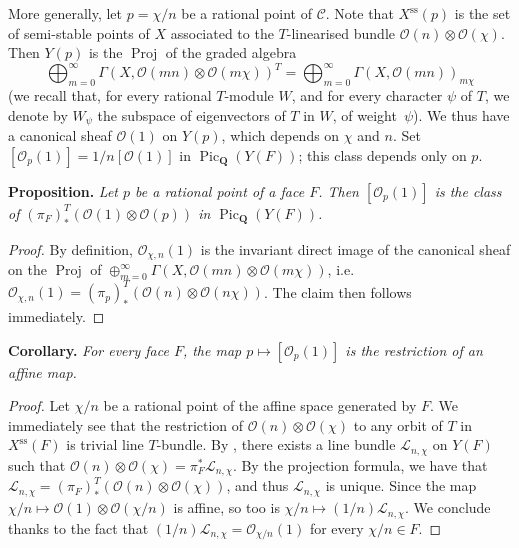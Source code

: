\documentclass{article}
\newenvironment{itenv}[1]
  {\phantomsection\par\medskip\noindent\textbf{#1.}\itshape}
  {\par\medskip}
\newcommand{\scr}[1]{{\mathscr{#1}}}
\newcommand{\QQ}{\mathbf{Q}}
\renewcommand{\ss}{\mathrm{ss}}
\DeclareMathOperator{\Pic}{Pic}
\DeclareMathOperator{\Proj}{Proj}
\newcommand{\oldpage}[1]{\marginpar{\footnotesize$\Big\vert$ \textit{p.~#1}}}
\begin{document}
More generally, let $p=\chi/n$ be a rational point of $\mathcal{C}$.
Note that $X^\ss(p)$ is the set of semi-stable points of $X$ associated to the
\oldpage{514}
$T$-linearised bundle $\scr{O}(n)\otimes\scr{O}(\chi)$.
Then $Y(p)$ is the $\Proj$ of the graded algebra
\[
  \bigoplus_{m=0}^\infty \Gamma(X,\scr{O}(mn)\otimes\scr{O}(m\chi))^T = \bigoplus_{m=0}^\infty \Gamma(X,\scr{O}(mn))_{m\chi}
\]
(we recall that, for every rational $T$-module $W$, and for every character $\psi$ of $T$, we denote by $W_\psi$ the subspace of eigenvectors of $T$ in $W$, of weight~$\psi$).
We thus have a canonical sheaf $\scr{O}(1)$ on $Y(p)$, which depends on $\chi$ and $n$.
Set $[\scr{O}_p(1)] = 1/n[\scr{O}(1)]$ in $\Pic_\QQ(Y(F))$;
this class depends only on $p$.

\begin{itenv}{Proposition}
  Let $p$ be a rational point of a face $F$.
  Then $[\scr{O}_p(1)]$ is the class of $(\pi_F)_*^T(\scr{O}(1)\otimes\scr{O}(p))$ in $\Pic_\QQ(Y(F))$.
\end{itenv}

\begin{proof}
  By definition, $\scr{O}_{\chi,n}(1)$ is the invariant direct image of the canonical sheaf on the $\Proj$ of $\oplus_{m=0}^\infty\Gamma(X,\scr{O}(mn)\otimes\scr{O}(m\chi))$, i.e. $\scr{O}_{\chi,n}(1) = (\pi_p)_*^T(\scr{O}(n)\otimes\scr{O}(n\chi))$.
  The claim then follows immediately.
\end{proof}

\begin{itenv}{Corollary}
  For every face $F$, the map $p\mapsto[\scr{O}_p(1)]$ is the restriction of an affine map.
\end{itenv}

\begin{proof}
  Let $\chi/n$ be a rational point of the affine space generated by $F$.
  We immediately see that the restriction of $\scr{O}(n)\otimes\scr{O}(\chi)$ to any orbit of $T$ in $X^\ss(F)$ is trivial line $T$-bundle.
  By \cite[Proposition~3]{Kra2}, there exists a line bundle $\scr{L}_{n,\chi}$ on $Y(F)$ such that $\scr{O}(n)\otimes\scr{O}(\chi)=\pi_F^*\scr{L}_{n,\chi}$.
  By the projection formula, we have that $\scr{L}_{n,\chi}=(\pi_F)_*^T(\scr{O}(n)\otimes\scr{O}(\chi))$, and thus $\scr{L}_{n,\chi}$ is unique.
  Since the map $\chi/n\mapsto\scr{O}(1)\otimes\scr{O}(\chi/n)$ is affine, so too is $\chi/n\mapsto(1/n)\scr{L}_{n,\chi}$.
  We conclude thanks to the fact that $(1/n)\scr{L}_{n,\chi}=\scr{O}_{\chi/n}(1)$ for every $\chi/n\in F$.
\end{proof}
\end{document}
